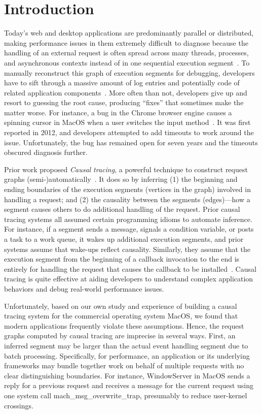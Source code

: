 \section{Introduction} \label{sec:intro}
Today's web and desktop applications are predominantly parallel or distributed,
making performance issues in them extremely difficult to diagnose because the
handling of an external request is often spread across many threads, processes,
and asynchronous contexts instead of in one sequential execution
segment~\cite{harter2012file}.  To manually reconstruct this graph of execution
segments for debugging, developers have to sift through a massive amount of log
entries and potentially code of related application
components~\cite{chen2002pinpoint, zhao2016non, xu2009detecting,
nagaraj2012structured, yuan2012conservative}.  More often than not, developers
give up and resort to guessing the root cause, producing ``fixes'' that
sometimes make the matter worse.  For instance, a bug in the Chrome browser
engine causes a spinning cursor in MacOS when a user switches the input
method~\cite{chromiumbugreport}.  It was first reported in 2012, and developers
attempted to add timeouts to work around the issue.  Unfortunately, the bug has
remained open for seven years and the timeouts obscured diagnosis further.

Prior work proposed \emph{Causal tracing}, a powerful technique to construct
request graphs (semi-)automatically~\cite{zhang2013panappticon}. It does so by
inferring (1) the beginning and ending boundaries of the execution segments
(vertices in the graph) involved in handling a request; and (2) the causality
between the segments (edges)---how a segment causes others to do additional
handling of the request.  Prior causal tracing systems all assumed certain
programming idioms to automate inference.  For instance, if a segment sends a
message, signals a condition variable, or posts a task to a work queue, it
wakes up additional execution segments, and prior systems assume that wake-ups
reflect causality.  Similarly, they assume that the execution segment from the
beginning of a callback invocation to the end is entirely for handling the
request that causes the callback to be
installed~\cite{zhang2013panappticon, ravindranath2012appinsight}.
Causal tracing is quite effective at aiding developers to understand complex
application behaviors and debug real-world performance issues.%

Unfortunately, based on our own study and experience of building a causal
tracing system for the commercial operating system MacOS, we found that modern
applications frequently violate these assumptions. Hence, the request graphs
computed by causal tracing are imprecise in several ways.  First, an inferred
segment may be larger than the actual event handling segment due to batch
processing.  Specifically, for performance, an application or its underlying
frameworks may bundle together work on behalf of multiple requests with no
clear distinguishing boundaries.  For instance, WindowServer in MacOS sends a
reply for a previous request and receives a message for the current request
using one system call mach\_msg\_overwrite\_trap, presumably to reduce
user-kernel crossings.


